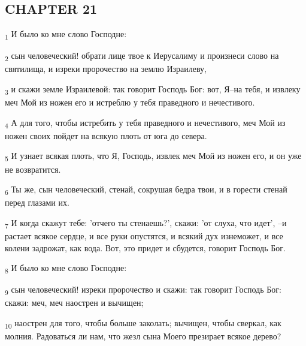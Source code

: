 \subsection{CHAPTER 21}
\begin{tcolorbox}
\textsubscript{1} И было ко мне слово Господне:
\end{tcolorbox}
\begin{tcolorbox}
\textsubscript{2} сын человеческий! обрати лице твое к Иерусалиму и произнеси слово на святилища, и изреки пророчество на землю Израилеву,
\end{tcolorbox}
\begin{tcolorbox}
\textsubscript{3} и скажи земле Израилевой: так говорит Господь Бог: вот, Я--на тебя, и извлеку меч Мой из ножен его и истреблю у тебя праведного и нечестивого.
\end{tcolorbox}
\begin{tcolorbox}
\textsubscript{4} А для того, чтобы истребить у тебя праведного и нечестивого, меч Мой из ножен своих пойдет на всякую плоть от юга до севера.
\end{tcolorbox}
\begin{tcolorbox}
\textsubscript{5} И узнает всякая плоть, что Я, Господь, извлек меч Мой из ножен его, и он уже не возвратится.
\end{tcolorbox}
\begin{tcolorbox}
\textsubscript{6} Ты же, сын человеческий, стенай, сокрушая бедра твои, и в горести стенай перед глазами их.
\end{tcolorbox}
\begin{tcolorbox}
\textsubscript{7} И когда скажут тебе: 'отчего ты стенаешь?', скажи: 'от слуха, что идет', --и растает всякое сердце, и все руки опустятся, и всякий дух изнеможет, и все колени задрожат, как вода. Вот, это придет и сбудется, говорит Господь Бог.
\end{tcolorbox}
\begin{tcolorbox}
\textsubscript{8} И было ко мне слово Господне:
\end{tcolorbox}
\begin{tcolorbox}
\textsubscript{9} сын человеческий! изреки пророчество и скажи: так говорит Господь Бог: скажи: меч, меч наострен и вычищен;
\end{tcolorbox}
\begin{tcolorbox}
\textsubscript{10} наострен для того, чтобы больше заколать; вычищен, чтобы сверкал, как молния. Радоваться ли нам, что жезл сына Моего презирает всякое дерево?
\end{tcolorbox}
